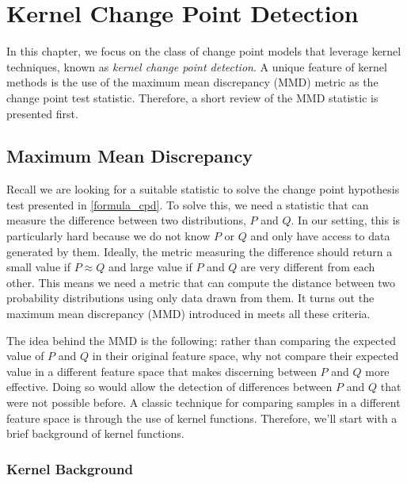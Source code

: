 \chapter{Kernel Change Point Detection}
In this chapter, we focus on the class of change point models that leverage kernel techniques, known as \textit{kernel change point detection}. A unique feature of kernel methods is the use of the maximum mean discrepancy (MMD) metric as the change point test statistic. Therefore, a short review of the MMD statistic is presented first.



\section{Maximum Mean Discrepancy}
\label{mmd}
Recall we are looking for a suitable statistic to solve the change point hypothesis test presented in \ref{formula_cpd}. To solve this, we need a statistic that can measure the difference between two distributions, $P$ and $Q$. In our setting, this is particularly hard because we do not know $P$ or $Q$ and only have access to data generated by them. Ideally, the metric measuring the difference should return a small value if $P \approx  Q$ and large value if $P$ and $Q$ are very different from each other. This means we need a metric that can compute the distance between two probability distributions using only data drawn from them. It turns out the maximum mean discrepancy (MMD) introduced in \cite{gretton2012kernel} meets all these criteria.

The idea behind the MMD is the following: rather than comparing the expected value of $P$ and $Q$ in their original feature space, why not compare their expected value in a different feature space that makes discerning between $P$ and $Q$ more effective. Doing so would allow the detection of differences between $P$ and $Q$ that were not possible before. A classic technique for comparing samples in a different feature space is through the use of kernel functions. Therefore, we'll start with a brief background of kernel functions.

\subsection{Kernel Background}

